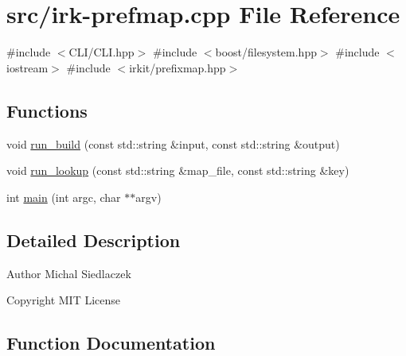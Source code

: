 \hypertarget{irk-prefmap_8cpp}{}\section{src/irk-\/prefmap.cpp File Reference}
\label{irk-prefmap_8cpp}
{\ttfamily \#include $<$C\+L\+I/\+C\+L\+I.\+hpp$>$}\newline
{\ttfamily \#include $<$boost/filesystem.\+hpp$>$}\newline
{\ttfamily \#include $<$iostream$>$}\newline
{\ttfamily \#include $<$irkit/prefixmap.\+hpp$>$}\newline
\subsection*{Functions}
\begin{DoxyCompactItemize}
\item 
void \mbox{\hyperlink{irk-prefmap_8cpp_a4330c09b4157029d4e97f57d221f54ea}{run\+\_\+build}} (const std\+::string \&input, const std\+::string \&output)
\item 
void \mbox{\hyperlink{irk-prefmap_8cpp_a3297f4a7dd9fab2d2fc9860efc147021}{run\+\_\+lookup}} (const std\+::string \&map\+\_\+file, const std\+::string \&key)
\item 
int \mbox{\hyperlink{irk-prefmap_8cpp_a3c04138a5bfe5d72780bb7e82a18e627}{main}} (int argc, char $\ast$$\ast$argv)
\end{DoxyCompactItemize}


\subsection{Detailed Description}
\begin{DoxyAuthor}{Author}
Michal Siedlaczek 
\end{DoxyAuthor}
\begin{DoxyCopyright}{Copyright}
M\+IT License 
\end{DoxyCopyright}


\subsection{Function Documentation}
\mbox{\label{irk-prefmap_8cpp_a3c04138a5bfe5d72780bb7e82a18e627}} 

